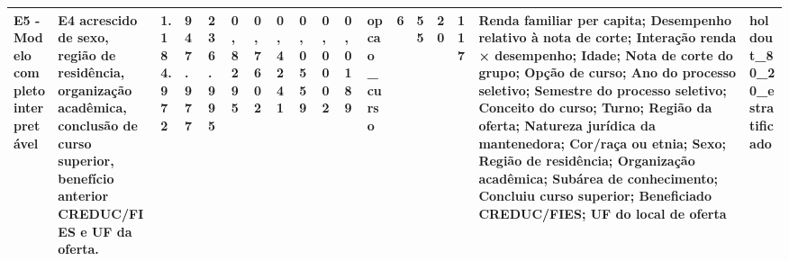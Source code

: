 \begin{table}
\begin{tabular}{llllllllllllllllll}
E5 - Modelo completo interpretável & E4 acrescido de sexo, região de residência, organização acadêmica, conclusão de curso superior, benefício anterior CREDUC/FIES e UF da oferta. & 1.184.972 & 947.977 & 236.995 & 0,8295 & 0,7602 & 0,4241 & 0,0559 & 0,0002 & 0,0189 & opcao\_curso & 6 & 55 & 20 & 117 & Renda familiar per capita; Desempenho relativo à nota de corte; Interação renda × desempenho; Idade; Nota de corte do grupo; Opção de curso; Ano do processo seletivo; Semestre do processo seletivo; Conceito do curso; Turno; Região da oferta; Natureza jurídica da mantenedora; Cor/raça ou etnia; Sexo; Região de residência; Organização acadêmica; Subárea de conhecimento; Concluiu curso superior; Beneficiado CREDUC/FIES; UF do local de oferta & holdout\_80\_20\_estratificado \\
\bottomrule
\end{tabular}
\end{table}
